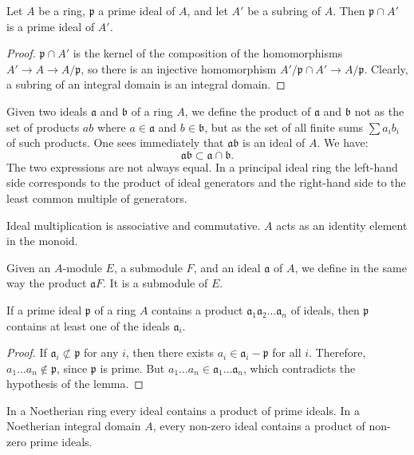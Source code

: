 \begin{lemma}\label{lem:III.3.1}
Let $A$ be a ring, $\mathfrak{p}$ a prime ideal of $A$, and let $A'$ be a
subring of $A$. Then $\mathfrak{p}\cap A'$ is a prime ideal of $A'$.
\end{lemma}

\begin{proof}
$\mathfrak{p}\cap A'$ is the kernel of the composition of the homomorphisms
$A'\to A\to A/\mathfrak{p}$, so there is an injective homomorphism
$A'/\mathfrak{p}\cap A'\to A/\mathfrak{p}$. Clearly, a subring of an integral
domain is an integral domain.
\end{proof}

Given two ideals $\mathfrak{a}$ and $\mathfrak{b}$ of a ring $A$, we define
the product of $\mathfrak{a}$ and $\mathfrak{b}$ not as the set of products
$ab$ where $a\in\mathfrak{a}$ and $b\in\mathfrak{b}$, but as the set of all
finite sums $\sum a_{i}b_{i}$ of such products. One sees immediately that
$\mathfrak{a}\mathfrak{b}$ is an ideal of $A$. We have:
\[
\mathfrak{a}\mathfrak{b}\subset\mathfrak{a}\cap\mathfrak{b}.
\]
The two expressions are not always equal. In a principal ideal ring the
left-hand side corresponds to the product of ideal generators and the
right-hand side to the least common multiple of generators.

Ideal multiplication is associative and commutative. $A$ acts as an identity
element in the monoid.

Given an $A$-module $E$, a submodule $F$, and an ideal $\mathfrak{a}$ of
$A$, we define in the same way the product $\mathfrak{a}F$. It is a
submodule of $E$.

\begin{lemma}\label{lem:III.3.2}
If a prime ideal $\mathfrak{p}$ of a ring $A$ contains a product
$\mathfrak{a}_{1}\mathfrak{a}_{2}\ldots\mathfrak{a}_{n}$ of ideals, then
$\mathfrak{p}$ contains at least one of the ideals $\mathfrak{a}_{i}$.
\end{lemma}

\begin{proof}
If $\mathfrak{a}_{i}\not\subset\mathfrak{p}$ for any $i$, then there exists
$a_{i}\in\mathfrak{a}_{i}-\mathfrak{p}$ for all $i$. Therefore,
$a_{1}\ldots a_{n}\notin\mathfrak{p}$, since $\mathfrak{p}$ is prime. But
$a_{1}\ldots a_{n}\in\mathfrak{a}_{1}\ldots\mathfrak{a}_{n}$, which
contradicts the hypothesis of the lemma.
\end{proof}

\begin{lemma}\label{lem:III.3.3}
In a Noetherian ring every ideal contains a product of prime ideals. In a
Noetherian integral domain $A$, every non-zero ideal contains a product of
non-zero prime ideals.
\end{lemma}

